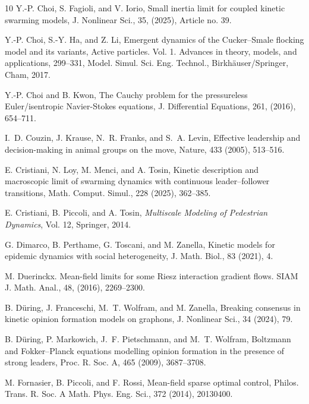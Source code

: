 \documentclass[10pt, reqno]{amsart}
\theoremstyle{definition}
\theoremstyle{remark}
\numberwithin{equation}{section}
\begin{document}
\begin{thebibliography}{10}
 Y.-P. Choi, S. Fagioli, and V. Iorio, Small inertia limit for coupled kinetic swarming models, J. Nonlinear Sci., 35, (2025), Article no. 39.

 Y.-P. Choi, S.-Y. Ha, and Z. Li, Emergent dynamics of the Cucker--Smale flocking model and its variants, Active particles. Vol. 1. Advances in theory, models, and applications, 299--331, Model. Simul. Sci. Eng. Technol., Birkh\"auser/Springer, Cham, 2017.

 Y.-P. Choi and B. Kwon, The Cauchy problem for the pressureless Euler/isentropic Navier-Stokes equations, J. Differential Equations, 261, (2016), 654--711.



 I.~D. Couzin, J. Krause, N.~R. Franks, and S.~A. Levin, Effective leadership and decision-making in animal groups on the move, Nature, 433 (2005), 513--516.

 E. Cristiani, N. Loy, M. Menci, and A. Tosin, Kinetic description and macroscopic limit of swarming dynamics with continuous leader–follower transitions, Math. Comput. Simul., 228 (2025), 362--385.

 E. Cristiani, B. Piccoli, and A. Tosin, \emph{Multiscale Modeling of Pedestrian Dynamics}, Vol. 12, Springer, 2014.

 G. Dimarco, B. Perthame, G. Toscani, and M. Zanella, Kinetic models for epidemic dynamics with social heterogeneity, J. Math. Biol., 83 (2021), 4.


 M. Duerinckx. Mean-field limits for some Riesz interaction gradient flows. SIAM J. Math. Anal., 48, (2016), 2269--2300.

 B. Düring, J. Franceschi, M.~T. Wolfram, and M. Zanella, Breaking consensus in kinetic opinion formation models on graphons, J. Nonlinear Sci., 34 (2024), 79.


 B. Düring, P. Markowich, J.~F. Pietschmann, and M.~T. Wolfram, Boltzmann and Fokker--Planck equations modelling opinion formation in the presence of strong leaders, Proc. R. Soc. A, 465 (2009), 3687--3708.


 M. Fornasier, B. Piccoli, and F. Rossi, Mean-field sparse optimal control, Philos. Trans. R. Soc. A Math. Phys. Eng. Sci., 372 (2014), 20130400.



\end{thebibliography}
\end{document}
